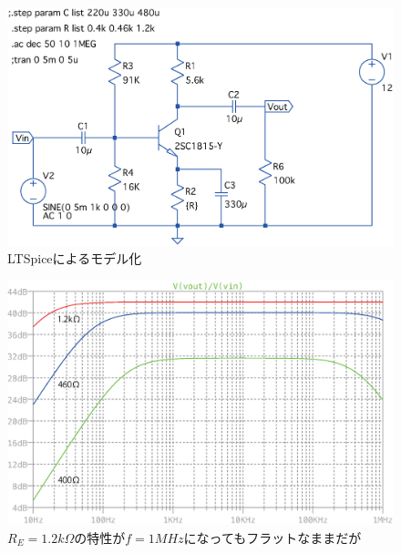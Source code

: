 \documentclass[uplatex,a4paper,11pt,oneside,openany]{jsbook}
\begin{document}
\newpage

    \begin{figure}[H]
       \centering
        \includegraphics[keepaspectratio, scale=0.65, angle=0]
                    {figs/eps/kyokasyoM1Yalt.eps}
                    \caption{LTSpiceによるモデル化}
                    \label{fig:spice1}
    \end{figure}
  
    \begin{figure}[H]
       \centering
        \includegraphics[keepaspectratio, scale=0.65, angle=0]
                  {figs/eps/_kyokasyoM1YaltFrqs.eps}
                  \caption{$R_E=1.2k\Omega$の特性が$f=1MHz$になってもフラットなままだが}
                  \label{fig:spice2}
    \end{figure}
\end{document}
